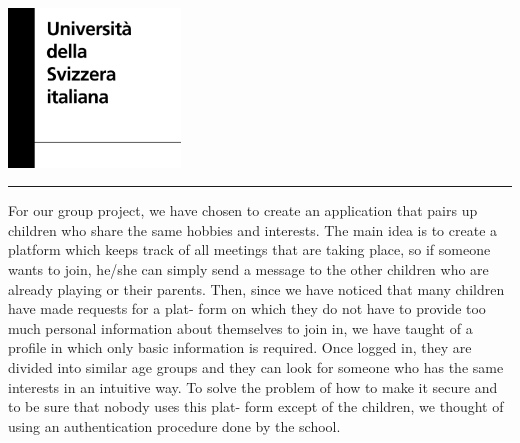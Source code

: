 \documentclass[12pt]{report}
\begin{document}
\setlength{\voffset}{-1in}
\setlength{\oddsidemargin}{-60pt}
\begin{titlepage}
\vspace*{2pt}
\parbox[b]{0.75\textwidth[124pt]}{\includegraphics[width=130pt]{University-of-Lugano.png}}
\hspace*{10pt}
\rule{1pt}{\textheight}
\end{titlepage}







\newpage
\setlength{\voffset}{0pt}
\setlength{\oddsidemargin}{17pt}
\pagestyle{fancy}
\fancyhf{}


For our group project, we have chosen to create an application that pairs up children who share the same
hobbies and interests. The main idea is to create a platform which keeps track of all meetings that are
taking place, so if someone wants to join, he/she can simply send a message to the other children who are
already playing or their parents. Then, since we have noticed that many children have made requests for a
plat- form on which they do not have to provide too much personal information about themselves to join in,
we have taught of a profile in which only basic information is required. Once logged in, they are divided
into similar age groups and they can look for someone who has the same interests in an intuitive way. To
solve the problem of how to make it secure and to be sure that nobody uses this plat- form except of the
children, we thought of using an authentication procedure done by the school. \\
\end{document}
